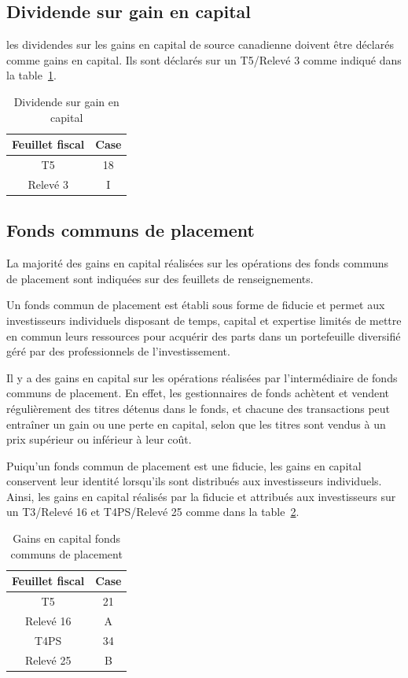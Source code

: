 \subsection{Dividende sur gain en capital}
les dividendes sur les gains en capital de source canadienne doivent être déclarés comme gains en capital. Ils sont déclarés sur un T5/Relevé 3 comme indiqué dans la  table~\ref{table:DividendeGainCapital}.
\begin{table}
	\centering
	\begin{tabular}{|c|c|}
		\hline
		Feuillet fiscal & Case \\ \hline
		      T5        &  18  \\ \hline
		   Relevé 3     &  I   \\ \hline
	\end{tabular}
	\caption{Dividende sur gain en capital}
	\label{table:DividendeGainCapital}
\end{table}


\subsection{Fonds communs de placement}
La majorité des gains en capital réalisées sur les opérations des fonds communs de placement sont indiquées sur des feuillets de renseignements.

Un fonds commun de placement est établi sous forme de fiducie et permet aux investisseurs individuels disposant de temps, capital et expertise limités de mettre en commun leurs ressources pour acquérir des parts dans un portefeuille diversifié géré par des professionnels de l'investissement.

Il y a des gains en capital sur les opérations réalisées par l'intermédiaire de fonds communs de placement. En effet, les gestionnaires de fonds achètent et vendent régulièrement des titres détenus dans le fonds, et chacune des transactions peut entraîner un gain ou une perte en capital, selon que les titres sont vendus à un prix supérieur ou inférieur à leur coût.

Puiqu'un fonds commun de placement est une fiducie, les gains en capital conservent leur identité lorsqu'ils sont distribués aux investisseurs individuels. Ainsi, les gains en capital réalisés par la fiducie et attribués aux investisseurs sur un T3/Relevé 16 et T4PS/Relevé 25 comme  dans la  table~\ref{table:GainsCapitalFCP}.
\begin{table}
	\centering
	\begin{tabular}{|c|c|}
		\hline
		Feuillet fiscal & Case \\ \hline
		      T5        &  21  \\ \hline
		   Relevé 16    &  A   \\ \hline
		     T4PS       &  34  \\ \hline
		   Relevé 25    &  B   \\ \hline
	\end{tabular}
	\caption{Gains en capital fonds communs de placement}
	\label{table:GainsCapitalFCP}
\end{table} 

